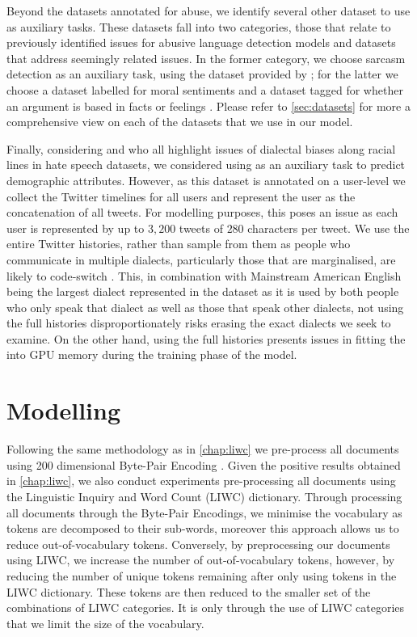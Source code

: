 Beyond the datasets annotated for abuse, we identify several other dataset to use as auxiliary tasks. These datasets fall into two categories, those that relate to previously identified issues for abusive language detection models and datasets that address seemingly related issues. In the former category, we choose sarcasm detection as an auxiliary task, using the dataset provided by \citet{Oraby_sarcasm:2017}; for the latter we choose a dataset labelled for moral sentiments \citet{Hoover:2019} and a dataset tagged for whether an argument is based in facts or feelings \citet{Oraby_fact_feel:2017}. Please refer to \autoref{sec:datasets} for more a comprehensive view on each of the datasets that we use in our model.

Finally, considering \citet{Waseem:2018,Davidson:2019} and \citet{Sap:2019} who all highlight issues of dialectal biases along racial lines in hate speech datasets, we considered using \citet{Preotiuc-Unger:2018} as an auxiliary task to predict demographic attributes. However, as this dataset is annotated on a user-level we collect the Twitter timelines for all users and represent the user as the concatenation of all tweets. For modelling purposes, this poses an issue as each user is represented by up to $3,200$ tweets of $280$ characters per tweet. We use the entire Twitter histories, rather than sample from them as people who communicate in multiple dialects, particularly those that are marginalised, are likely to code-switch \cite{CITE: AAE code switching paper}. This, in combination with Mainstream American English being the largest dialect represented in the dataset as it is used by both people who only speak that dialect as well as those that speak other dialects, not using the full histories disproportionately risks erasing the exact dialects we seek to examine. On the other hand, using the full histories presents issues in fitting the into GPU memory during the training phase of the model.

\section{Modelling}

Following the same methodology as in \autoref{chap:liwc} we pre-process all documents using 200 dimensional Byte-Pair Encoding \cite{Heinzerling:2018}. Given the positive results obtained in \autoref{chap:liwc}, we also conduct experiments pre-processing all documents using the Linguistic Inquiry and Word Count (LIWC) dictionary. Through processing all documents through the Byte-Pair Encodings, we minimise the vocabulary as tokens are decomposed to their sub-words, moreover this approach allows us to reduce out-of-vocabulary tokens. Conversely, by preprocessing our documents using LIWC, we increase the number of out-of-vocabulary tokens, however, by reducing the number of unique tokens remaining after only using tokens in the LIWC dictionary. These tokens are then reduced to the smaller set of the combinations of LIWC categories. It is only through the use of LIWC categories that we limit the size of the vocabulary.\vspace{5mm}

